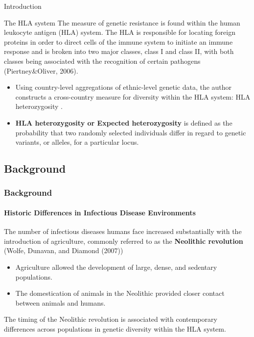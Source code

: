 \documentclass[pdftex,12pt,xcolor=pdftex,table]{beamer}
\theoremstyle{definition}
\theoremstyle{remark}
\numberwithin{equation}{section}
\numberwithin{figure}{section}
\begin{document}
\begin{frame}{Introduction}
\begin{block}{The HLA system}
\justifying
The measure of genetic resistance is  found within the human leukocyte antigen (HLA) system. The HLA is responsible for locating foreign proteins in order to direct cells of the immune system to initiate an immune response and is broken into two major classes, class I and class II, with both classes being associated with the recognition of certain pathogens (Piertney\&Oliver, 2006).

\end{block}
\begin{itemize}
    \item
Using country-level aggregations of ethnic-level genetic data, the author constructs a cross-country measure for diversity within the HLA system: HLA heterozygosity .
\end{itemize}

\begin{itemize}
    \item \textbf{HLA heterozygosity or  Expected heterozygosity} is defined as the probability that two randomly selected individuals differ in regard to genetic variants, or alleles, for a particular locus. 

\end{itemize}



\end{frame}




\begin{frame}\section{Background}
\frametitle{Background}
\framesubtitle{Historic Differences in Infectious Disease Environments}
\justifying
The number of infectious diseases humans face increased substantially with the introduction of agriculture, commonly referred to as the \textbf{Neolithic revolution} (Wolfe, Dunavan, and Diamond (2007))
\begin{itemize}
    \item Agriculture allowed the development of large, dense, and sedentary populations.
    
\item The domestication of animals in the Neolithic provided closer contact between animals and humans.

\end{itemize}
The timing of the Neolithic revolution is associated with contemporary differences across populations in genetic diversity within the HLA system.



\end{frame}
\end{document}
